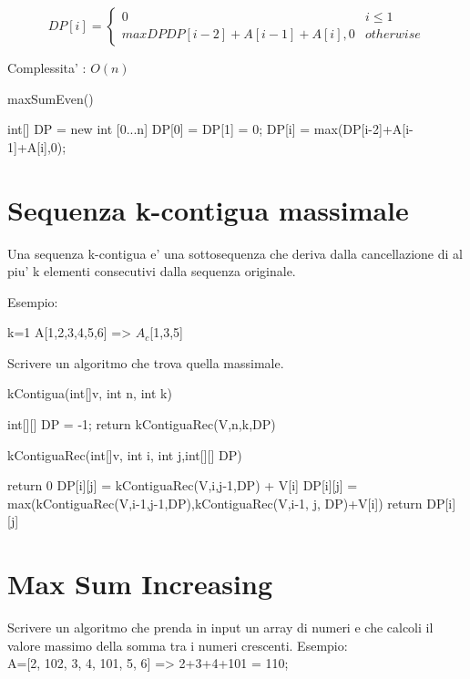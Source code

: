 \documentclass[oneside]{book}
\begin{document}
\begin{equation}
  DP[i] =
    \begin{cases}
     0 & i \leq 1 \\
     maxDP{DP[i-2]+A[i-1]+A[i],0} & otherwise
    \end{cases}  
\end{equation}

Complessita' : $O(n)$

\begin{algorithm}
\caption{maxSumEven()\label{alg:cap}}
\begin{algorithmic}
\State int[] DP = new int [0...n]
\State DP[0] = DP[1] = 0;
	\State DP[i] = max(DP[i-2]+A[i-1]+A[i],0);
\EndFor
\end{algorithmic}
\end{algorithm}
\section{Sequenza k-contigua massimale}
Una sequenza k-contigua e' una sottosequenza che deriva dalla cancellazione di al piu' k elementi consecutivi dalla sequenza originale.

Esempio: 

k=1
A[1,2,3,4,5,6] => $A_c$[1,3,5] 

Scrivere un algoritmo che trova quella massimale.

\begin{algorithm}
\caption{kContigua(int[]v, int n, int k)\label{cap:alg}}
\begin{algorithmic}
\State int[][] DP = -1;
\State return kContiguaRec(V,n,k,DP)
\end{algorithmic}
\end{algorithm}

\begin{algorithm}
\caption{kContiguaRec(int[]v, int i, int j,int[][] DP)\label{cap:alg}}
\begin{algorithmic}
	\State return 0
\EndIf
{}
		\State DP[i][j] = kContiguaRec(V,i,j-1,DP) + V[i]
	\Else
		\State DP[i][j] = max(kContiguaRec(V,i-1,j-1,DP),kContiguaRec(V,i-1, j, DP)+V[i])
	\EndIf
\EndIf		
return DP[i][j]
\end{algorithmic}
\end{algorithm}

\section{Max Sum Increasing}
Scrivere un algoritmo che prenda in input un array di numeri e che calcoli il valore massimo della somma tra i numeri crescenti. Esempio:\\
A=[2, 102, 3, 4, 101, 5, 6] => 2+3+4+101 = 110;
\end{document}

